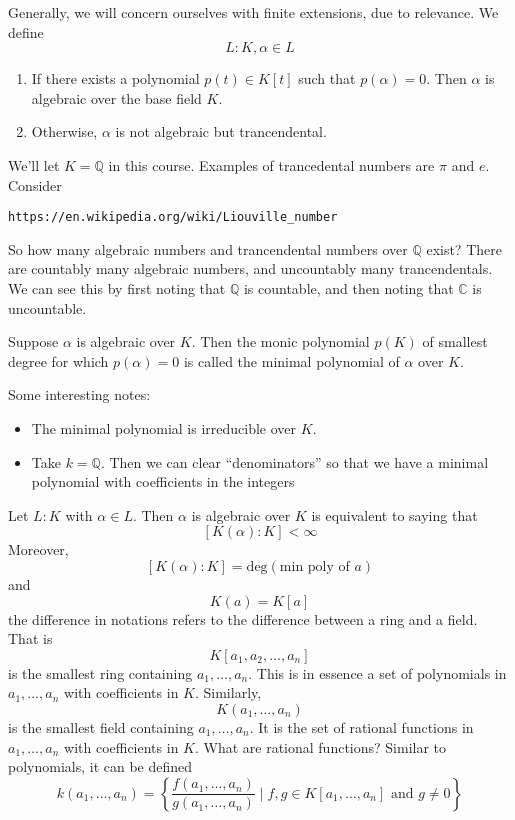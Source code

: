 \documentclass{article}
\begin{document}
Generally, we will concern ourselves with finite extensions, due to relevance.
We define 
\[ L : K, \alpha \in L \]
\begin{enumerate}
\item If there exists a polynomial $p(t) \in K[t]$ such that $p(\alpha) = 0$.
Then $\alpha$ is algebraic over the base field $K$. 
\item Otherwise, $\alpha$ is not algebraic but trancendental.
\end{enumerate}
We'll let $K = \mathbb{Q}$ in this course. Examples of trancedental numbers are
$\pi$ and $e$. Consider
\begin{verbatim}https://en.wikipedia.org/wiki/Liouville_number\end{verbatim}
So how many algebraic numbers and trancendental numbers over $\mathbb{Q}$ exist?
There are countably many algebraic numbers, and uncountably many trancendentals.
We can see this by first noting that $\mathbb{Q}$ is countable, and then noting
that $\mathbb{C}$ is uncountable. 

Suppose $\alpha$ is algebraic over $K$. Then the monic polynomial $p(K)$ of smallest
degree for which $p(\alpha) = 0$ is called the minimal polynomial of $\alpha$
over $K$. 

Some interesting notes:
\begin{itemize}
\item The minimal polynomial is irreducible over $K$. 
\item Take $k = \mathbb{Q}$. Then we can clear ``denominators'' so that we have
a minimal polynomial with coefficients in the integers
\end{itemize}

Let $L:K$ with $\alpha \in L$. Then $\alpha$ is algebraic over $K$ is equivalent
to saying that
\[ [ K(\alpha) : K ] < \infty \]
Moreover,
\[ [ K(\alpha) : K ] = \text{deg}(\text{min poly of }a) \]
and 
\[ K(a) = K[a] \]
the difference in notations refers to the difference between a ring and a field.
That is
\[ K[a_1, a_2, \ldots, a_n] \]
is the smallest ring containing $a_1,\ldots,a_n$. This is in essence a set of
polynomials in $a_1, \ldots, a_n$ with coefficients in $K$. Similarly, 
\[ K(a_1, \ldots, a_n) \]
is the smallest field containing $a_1,\ldots,a_n$. It is the set of rational
functions in $a_1, \ldots, a_n$ with coefficients in $K$. What are rational
functions? Similar to polynomials, it can be defined
\[ k(a_1,\ldots,a_n) = \left\{\frac{f(a_1, \ldots, a_n)}{g(a_1, \ldots,
a_n)} \mid f,g \in K[a_1,\ldots,a_n] \text{ and } g \neq 0 \right\} \]
\end{document}
